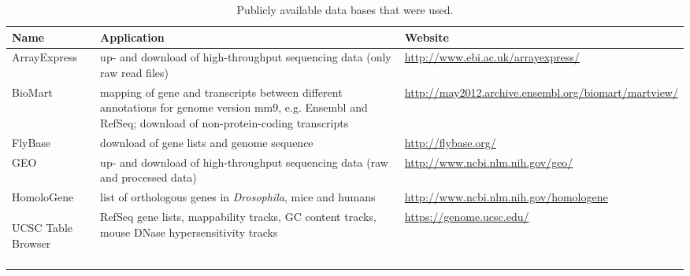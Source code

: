 \begin{minipage}{\textwidth} %
\begin{singlespacing}
\begin{small}
\setlength{\extrarowheight}{2pt}
\begin{longtable}[l]{>{\textsf\bgroup}p{2cm}<{\egroup} >{\textsf\bgroup}p{6cm}<{\egroup} >{\textsf\bgroup}p{6cm}<{\egroup}} %
\caption[Publicly available data bases that were used.]{\textsf{Publicly available data bases that were used.}} \\ %
\textbf{Name} & \textbf{Application} & \textbf{Website}
\tabularnewline
\toprule
 ArrayExpress & up- and download of high-throughput sequencing data (only raw read files) & \url{http://www.ebi.ac.uk/arrayexpress/} 
\tabularnewline \midrule
 BioMart & mapping of gene and transcripts between different annotations for genome version mm9, e.g. Ensembl and RefSeq; download of non-protein-coding transcripts & \url{http://may2012.archive.ensembl.org/biomart/martview/} 
\tabularnewline \midrule
 FlyBase & download of gene lists and genome sequence & \url{http://flybase.org/} 
\tabularnewline \midrule
GEO & up- and download of high-throughput sequencing data (raw and processed data) & \url{http://www.ncbi.nlm.nih.gov/geo/} 
\tabularnewline \midrule
HomoloGene & list of orthologous genes in \textit{Drosophila}, mice and humans & \url{http://www.ncbi.nlm.nih.gov/homologene} 
\tabularnewline \midrule
\raggedright UCSC Table Browser & RefSeq gene lists, mappability tracks, GC content tracks, mouse DNase hypersensitivity tracks & \url{https://genome.ucsc.edu/}
\tabularnewline \bottomrule
\label{tab:DB}
\end{longtable}
\end{small}
\end{singlespacing}
\end{minipage}
